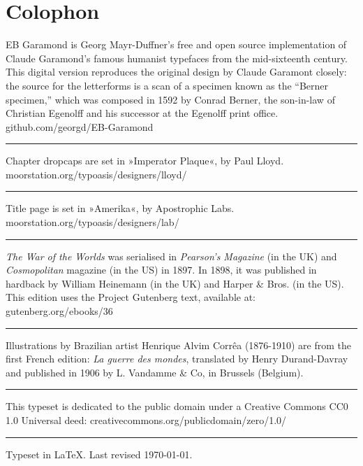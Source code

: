\documentclass[
a5paper,
BCOR=7mm,
twoside,
DIV=calc,
11pt,
usegeometry,
chapterprefix,
headings=big]{scrbook} %
\begin{document}
\chapter*{Colophon}
\begin{center}
EB Garamond is Georg Mayr-Duffner's free and open source implementation of Claude Garamond’s famous humanist typefaces from the mid-sixteenth century. This digital version reproduces the original design by Claude Garamont closely: the source for the letterforms is a scan of a specimen known as the \enquote{Berner specimen,} which was composed in 1592 by Conrad Berner, the son-in-law of Christian Egenolff and his successor at the Egenolff print office.  \\github.com/georgd/EB-Garamond
\vfill
\rule{0.5\textwidth}{.4pt}
\vfill
Chapter dropcaps are set in »Imperator Plaque«, by Paul Lloyd.\\moorstation.org/typoasis/designers/lloyd/
\vfill
\rule{0.5\textwidth}{.4pt}
\vfill
Title page is set in »Amerika«, by Apostrophic Labs.\\moorstation.org/typoasis/designers/lab/
\vfill
\rule{0.5\textwidth}{.4pt}
\vfill
\textit{The War of the Worlds} was serialised in \textit{Pearson's Magazine} (in the UK) and \textit{Cosmopolitan} magazine (in the US) in 1897. In 1898, it was published in hardback by William Heinemann (in the UK) and Harper \& Bros. (in the US). This edition uses the Project Gutenberg text, available at: gutenberg.org/ebooks/36 
\vfill
\rule{0.5\textwidth}{.4pt}
\vfill
Illustrations by Brazilian artist Henrique Alvim Corrêa (1876-1910) are from the first French edition: \textit{La guerre des mondes}, translated by Henry Durand-Davray and published in 1906 by L. Vandamme \& Co, in Brussels (Belgium).
\vfill
\rule{0.5\textwidth}{.4pt}
\vfill
This typeset is dedicated to the public domain under a Creative Commons CC0 1.0 Universal deed: creativecommons.org/publicdomain/zero/1.0/
\vfill
\rule{0.5\textwidth}{.4pt}
\vfill
Typeset in \LaTeX{}. Last revised \today.
\end{center}
\thispagestyle{empty}
\end{document}
